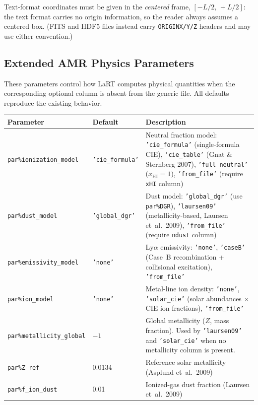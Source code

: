 \documentclass[english,a4paper]{my_memo}
\newcommand{\parm}[1]{\texttt{par\%#1}}
\begin{document}
Text-format coordinates must be given in the \emph{centered} frame,
$[-L/2,\,+L/2]$: the text format carries no origin information, so the reader
always assumes a centered box.  (FITS and HDF5 files instead carry
\texttt{ORIGINX/Y/Z} headers and may use either convention.)

\subsection{Extended AMR Physics Parameters}

These parameters control how LaRT computes physical quantities when the
corresponding optional column is absent from the generic file.  All defaults
reproduce the existing behavior.

\begin{center}
\begin{tabular}{@{}l@{\hspace{1em}}l@{\hspace{1em}}p{22em}@{}}
\toprule
Parameter & Default & Description \\
\midrule
\parm{ionization\_model} & \texttt{'cie\_formula'} &
  Neutral fraction model: \texttt{'cie\_formula'} (single-formula CIE),
  \texttt{'cie\_table'} (Gnat \& Sternberg 2007),
  \texttt{'full\_neutral'} ($x_\text{HI}=1$),
  \texttt{'from\_file'} (require \texttt{xHI} column) \\
\parm{dust\_model} & \texttt{'global\_dgr'} &
  Dust model: \texttt{'global\_dgr'} (use \parm{DGR}),
  \texttt{'laursen09'} (metallicity-based, Laursen et~al.\ 2009),
  \texttt{'from\_file'} (require \texttt{ndust} column) \\
\parm{emissivity\_model} & \texttt{'none'} &
  Ly$\alpha$ emissivity: \texttt{'none'},
  \texttt{'caseB'} (Case~B recombination + collisional excitation),
  \texttt{'from\_file'} \\
\parm{ion\_model} & \texttt{'none'} &
  Metal-line ion density: \texttt{'none'},
  \texttt{'solar\_cie'} (solar abundances $\times$ CIE ion fractions),
  \texttt{'from\_file'} \\
\parm{metallicity\_global} & $-1$ &
  Global metallicity ($Z$, mass fraction).  Used by \texttt{'laursen09'}
  and \texttt{'solar\_cie'} when no metallicity column is present. \\
\parm{Z\_ref} & 0.0134 &
  Reference solar metallicity (Asplund et~al.\ 2009) \\
\parm{f\_ion\_dust} & 0.01 &
  Ionized-gas dust fraction (Laursen et~al.\ 2009) \\
\bottomrule
\end{tabular}
\end{center}
\end{document}
